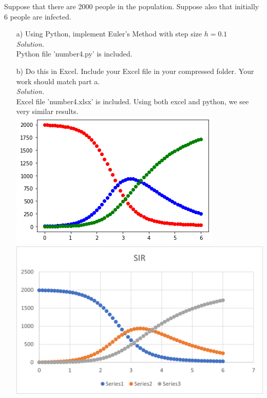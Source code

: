 \documentclass[12pt,letterpaper]{article}
\begin{document}
\begin{enumerate}
 Suppose that there are 2000 people in the population.  Suppose also that initially 6 people are infected. 
 \begin{enumerate}
 \item[a)] Using Python, implement Euler's Method  with step size $h=0.1$ \\
 \emph{Solution.}\\ 
 Python file 'number4.py' is included.  
\item[b)]  Do this in Excel. Include your Excel file in your compressed folder. Your work should match part a.\\
\emph{Solution.}\\ 
  Excel file 'number4.xlsx' is included. Using both excel and python, we see very similar results. \\
  \includegraphics{number4py.png}\\
  \includegraphics{number4excel.png}


\end{enumerate}
\end{enumerate}
\end{document}
